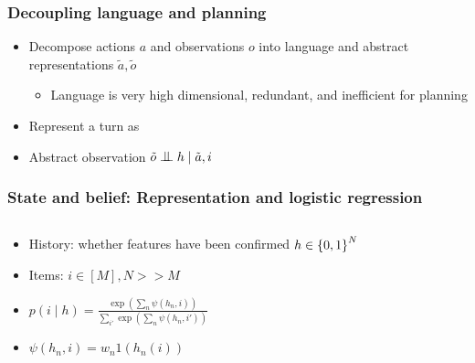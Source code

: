 \documentclass{beamer}
\newcommand{\bigCI}{\mathrel{\text{\scalebox{1.07}{$\perp\mkern-10mu\perp$}}}}
\begin{document}
\begin{frame}
\frametitle{Decoupling language and planning}
\begin{itemize}
\item Decompose actions $a$ and observations $o$ into language and abstract representations
    $\tilde{a}, \tilde{o}$
    \begin{itemize}
    \item Language is very high dimensional, redundant, and
        inefficient for planning
    \end{itemize}
\item Represent a turn as
\begin{center}
\end{center}
\item Abstract observation $\tilde{o} \bigCI h \mid \tilde{a}, i$
\end{itemize}
\end{frame}


\begin{frame}
\frametitle{State and belief: Representation and logistic regression}
\begin{columns}
\begin{column}{0.55\textwidth}
\begin{itemize}
\item History: whether features have been confirmed $h \in \left\{0,1\right\}^N$
\item Items: $i \in [M], N >> M$
\item $p(i \mid h) = \frac{\exp(\sum_n \psi(h_n, i))}{\sum_{i'} \exp(\sum_n\psi(h_n, i'))}$
\item $\psi(h_n, i) = w_n 1(h_n(i))$ 
\end{itemize}
\end{column}
\begin{column}{0.45\textwidth}
\centering
{}
\end{column}
\end{columns}
\end{frame}
\end{document}
